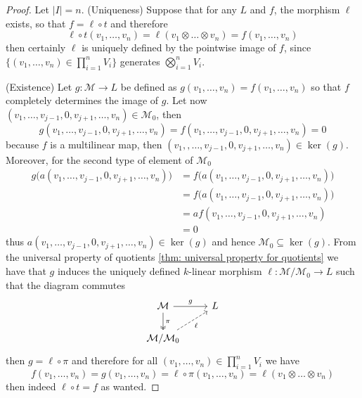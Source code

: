 \begin{proof}
  Let \(|I| = n\). (Uniqueness) Suppose that for any \(L\) and \(f\), the
  morphism \(\ell\) exists, so that \(f = \ell \circ t\) and therefore
  \[
    \ell \circ t(v_1, \dots, v_n) = \ell(v_1 \otimes \dots \otimes v_n)
    = f(v_1, \dots, v_n)
  \]
  then certainly \(\ell\) is uniquely defined by the pointwise image of \(f\),
  since \(\{(v_1, \dots, v_n) \in \prod_{i=1}^n V_i\}\) generates
  \(\bigotimes_{i=1}^n V_i\).

  (Existence) Let \(g : \mathcal M \to L\) be defined as \(g(v_1, \dots, v_n) =
  f(v_1, \dots, v_n)\) so that \(f\) completely determines the image of \(g\).
  Let now \((v_1, \dots, v_{j-1}, 0, v_{j+1}, \dots, v_n) \in \mathcal M_0\),
  then
  \[
    g(v_1, \dots, v_{j-1}, 0, v_{j+1}, \dots, v_n)
    = f(v_1, \dots, v_{j-1}, 0, v_{j+1}, \dots, v_n) = 0
  \]
  because \(f\) is a multilinear map, then \((v_1,, \dots, v_{j-1}, 0, v_{j+1},
  \dots, v_n) \in \ker(g)\). Moreover, for the second type of element of
  \(\mathcal M_0\)
  \begin{align*}
    g\big(a(v_1, \dots, v_{j-1}, 0, v_{j+1}, \dots, v_n)\big)
    &= f\big(a(v_1, \dots, v_{j-1}, 0, v_{j+1}, \dots, v_n)\big) \\
    &= f\big(a(v_1, \dots, v_{j-1}, 0, v_{j+1}, \dots, v_n)\big) \\
    &= a f(v_1, \dots, v_{j-1}, 0, v_{j+1}, \dots, v_n) \\
    &= 0
  \end{align*}
  thus \(a(v_1, \dots, v_{j-1}, 0, v_{j+1}, \dots, v_n) \in \ker(g)\) and
  hence \(\mathcal M_0 \subseteq \ker(g)\). From the universal property of
  quotients \cref{thm: universal property for quotients} we have that \(g\)
  induces the uniquely defined \(k\)-linear morphism \(\ell: \mathcal M /
  \mathcal M_0 \to L\) such that the diagram commutes
  \[
    \begin{tikzcd}
      \mathcal M
      \ar[d, two heads, "\pi"]
      \ar[r, "g"]
        &L \\
      \mathcal M / \mathcal M_0
      \ar[ur, swap, dashed, "\ell"]
        &
    \end{tikzcd}
  \]
  then \(g = \ell \circ \pi\) and therefore for all \((v_1, \dots, v_n) \in
  \prod_{i=1}^n V_i\) we have
  \[
    f(v_1, \dots, v_n)
    = g(v_1, \dots, v_n)
    = \ell \circ \pi (v_1, \dots, v_n)
    = \ell(v_1 \otimes \dots \otimes v_n)
  \]
  then indeed \(\ell \circ t = f\) as wanted.
\end{proof}


